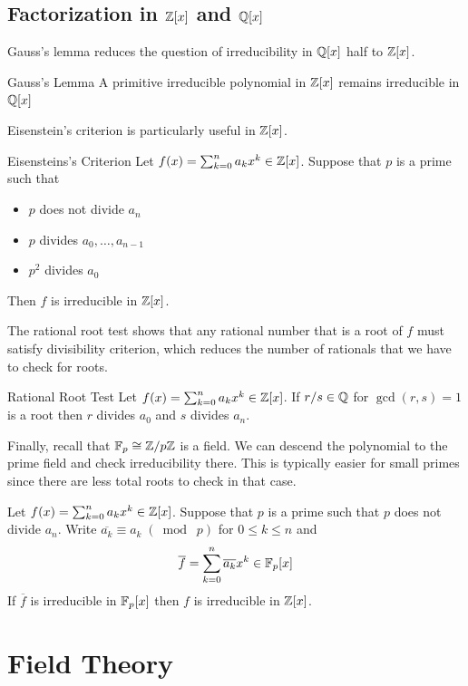 \documentclass[a4paper]{article}
\begin{document}
\subsection{Factorization in $\mathbb{Z}[x]$ and $\mathbb{Q}[x]$}
Gauss's lemma reduces the question of irreducibility in $\mathbb{Q}[x]$ half to $\mathbb{Z}[x]$. 

\begin{thm}{Gauss's Lemma}{} A primitive irreducible polynomial in $\mathbb{Z}[x]$ remains irreducible in $\mathbb{Q}[x]$
\end{thm}

Eisenstein's criterion is particularly useful in $\mathbb{Z}[x]$. 

\begin{thm}{Eisensteins's Criterion}{} Let $f(x)=\sum_{k=0}^na_kx^k\in\mathbb{Z}[x]$. Suppose that $p$ is a prime such that 
\begin{itemize}
\item $p$ does not divide $a_n$
\item $p$ divides $a_0,\dots,a_{n-1}$
\item $p^2$ divides $a_0$
\end{itemize}
Then $f$ is irreducible in $\mathbb{Z}[x]$. 
\end{thm}

The rational root test shows that any rational number that is a root of $f$ must satisfy divisibility criterion, which reduces the number of rationals that we have to check for roots. 

\begin{thm}{Rational Root Test}{} Let $f(x)=\sum_{k=0}^na_kx^k\in\mathbb{Z}[x]$. If $r/s\in\mathbb{Q}$ for $\gcd(r,s)=1$ is a root then $r$ divides $a_0$ and $s$ divides $a_n$. 
\end{thm}

Finally, recall that $\mathbb{F}_p\cong\mathbb{Z}/p\mathbb{Z}$ is a field. We can descend the polynomial to the prime field and check irreducibility there. This is typically easier for small primes since there are less total roots to check in that case. 

\begin{thm}{}{} Let $f(x)=\sum_{k=0}^na_kx^k\in\mathbb{Z}[x]$. Suppose that $p$ is a prime such that $p$ does not divide $a_n$. Write $\overline{a_k}\equiv a_k\;(\bmod\;p)$ for $0\leq k\leq n$ and $$\overline{f}=\sum_{k=0}^n\overline{a_k}x^k\in\mathbb{F}_p[x]$$ If $\overline{f}$ is irreducible in $\mathbb{F}_p[x]$ then $f$ is irreducible in $\mathbb{Z}[x]$. 
\end{thm}


\pagebreak

\section{Field Theory}
\end{document}
